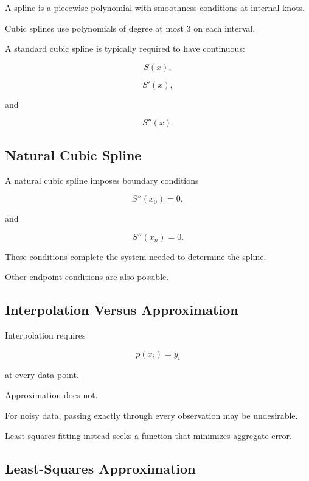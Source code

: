 A spline is a piecewise polynomial with smoothness conditions at internal
knots.

Cubic splines use polynomials of degree at most \(3\) on each interval.

A standard cubic spline is typically required to have continuous:

\[
\boxed{
S(x),
}
\]

\[
\boxed{
S'(x),
}
\]

and

\[
\boxed{
S''(x).
}
\]

\subsection{Natural Cubic Spline}
\label{subsec:natural-cubic-spline}

A natural cubic spline imposes boundary conditions

\[
\boxed{
S''(x_0)=0,
}
\]

and

\[
\boxed{
S''(x_n)=0.
}
\]

These conditions complete the system needed to determine the spline.

Other endpoint conditions are also possible.

\subsection{Interpolation Versus Approximation}
\label{subsec:interpolation-versus-approximation}

Interpolation requires

\[
\boxed{
p(x_i)=y_i
}
\]

at every data point.

Approximation does not.

For noisy data, passing exactly through every observation may be
undesirable.

Least-squares fitting instead seeks a function that minimizes aggregate
error.

\subsection{Least-Squares Approximation}
\label{subsec:numerical-least-squares}

